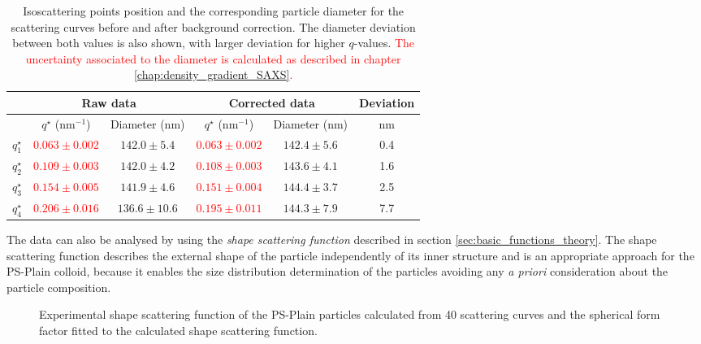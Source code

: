 \begin{table*}
\centering
\begin{tabular}{l||cc|cc|c}
& \multicolumn{2}{c}{Raw data} & \multicolumn{2}{c}{Corrected data} & Deviation\\
\hline
& \( q^{\star} \) (nm\(^{-1}\))    &  Diameter (nm) & \( q^{\star}\) (nm\(^{-1}\))    &  Diameter (nm) & nm \\
\hline
\(q^{\star}_1\) &  \textcolor{red}{$0.063\pm0.002$} & $142.0\pm5.4$ &  \textcolor{red}{$0.063\pm0.002$} & $142.4\pm5.6$ & 0.4 \\
\(q^{\star}_2\) &  \textcolor{red}{$0.109\pm0.003$} & $142.0\pm4.2$ &  \textcolor{red}{$0.108\pm0.003$} & $143.6\pm4.1$ & 1.6   \\
\(q^{\star}_3\) &  \textcolor{red}{$0.154\pm0.005$} & $141.9\pm4.6$ &  \textcolor{red}{$0.151\pm0.004$} & $144.4\pm3.7$ & 2.5    \\
\(q^{\star}_4\) &  \textcolor{red}{$0.206\pm0.016$}  & $136.6\pm10.6$ &  \textcolor{red}{$0.195\pm0.011$}  & $144.3\pm7.9$ & 7.7     \\
\end{tabular}
\caption[Isoscattering points position and their corresponding particle diameter.]{Isoscattering points position and the corresponding particle diameter for the scattering curves before and after background correction. The diameter deviation between both values is also shown, with larger deviation for higher $q$-values. \textcolor{red}{The uncertainty associated to the diameter is calculated as described in chapter \ref{chap:density_gradient_SAXS}.}}
\label{tab:isoscattering_points}
\end{table*}

The data can also be analysed by using the \emph{shape scattering function} described in section \ref{sec:basic_functions_theory}. The shape scattering function describes the external shape of the particle independently of its inner structure and is an appropriate approach for the PS-Plain colloid, because it enables the size distribution determination of the particles avoiding any \emph{a priori} consideration about the particle composition.

\begin{figure}
	\begin{center}
		
	\end{center}
	\caption[Experimental shape scattering function of the PS-Plain particles.]{Experimental shape scattering function of the PS-Plain particles calculated from 40 scattering curves and the spherical form factor fitted to the calculated shape scattering function.}
	\label{fig:PSPlainResonantTerm}
\end{figure}

